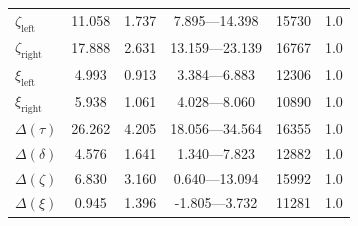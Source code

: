 \documentclass[doc,biblatex,floatsintext]{apa7}
\begin{document}
\begin{table}
\begin{center}
\begin{threeparttable}
\begin{tabular}{lccccc}
$\zeta_\mathrm{left}$   &  11.058 & 1.737 &   7.895---14.398  & 15730 & 1.0 \\
$\zeta_\mathrm{right}$  &  17.888 & 2.631 &  13.159---23.139  & 16767 & 1.0 \\
$\xi_\mathrm{left}$     &   4.993 & 0.913 &   3.384---6.883   & 12306 & 1.0 \\
$\xi_\mathrm{right}$    &   5.938 & 1.061 &   4.028---8.060   & 10890 & 1.0 \\
$\Delta(\tau)$          &  26.262 & 4.205 &  18.056---34.564  & 16355 & 1.0 \\
$\Delta(\delta)$        &   4.576 & 1.641 &   1.340---7.823   & 12882 & 1.0 \\
$\Delta(\zeta)$         &   6.830 & 3.160 &   0.640---13.094  & 15992 & 1.0 \\
$\Delta(\xi)$           &   0.945 & 1.396 &  -1.805---3.732   & 11281 & 1.0 \\
\bottomrule
\end{tabular}
\label{supptable3}
\end{threeparttable}
\end{center}
\end{table}
\end{document}

